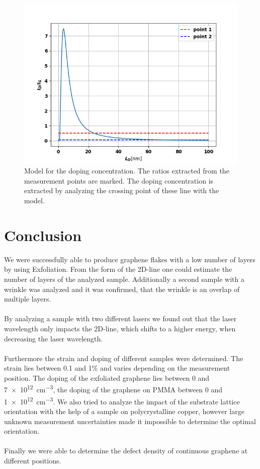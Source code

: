 \documentclass[12pt,a4paper]{article}
\begin{document}
\begin{figure}[!htb]
\centering
\includegraphics[scale=0.7]{Bilder/part7/fit.png}
\caption{Model for the doping concentration. The ratios extracted from the measurement points are marked. The doping concentration is extracted by analyzing the crossing point of these line with the model.}
\label{fig:part7_fit}
\end{figure}


\newpage
\section{Conclusion}
We were successfully able to produce graphene flakes with a low number of layers by using Exfoliation. From the form of the 2D-line one could estimate the number of layers of the analyzed sample. Additionally a second sample with a wrinkle was analyzed and it was confirmed, that the wrinkle is an overlap of multiple layers.\\
\\
By analyzing a sample with two different lasers we found out that the laser wavelength only impacts the 2D-line, which shifts to a higher energy, when decreasing the laser wavelength.\\
\\
Furthermore the strain and doping of different samples were determined. The strain lies between 0.1 and 1\% and varies depending on the measurement position. The doping of the exfoliated graphene lies between 0 and \SI{7e12}{cm^{-3}}, the doping of the graphene on PMMA between 0 and \SI{1e12}{cm^{-3}}. We also tried to analyze the impact of the substrate lattice orientation with the help of a sample on polycrystalline copper, however large unknown measurement uncertainties made it impossible to determine the optimal orientation.\\
\\
Finally we were able to determine the defect density of continuous graphene at different positions. 
\end{document}
